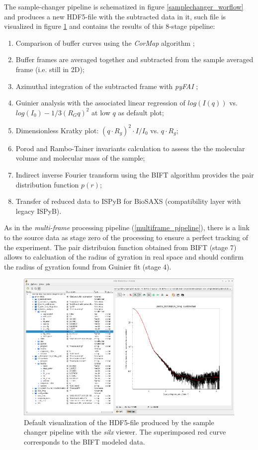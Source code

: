 \documentclass[preprint]{iucr}              %
\begin{document}
The sample-changer pipeline is schematized in figure \ref{samplechanger_worflow} and produces a new HDF5-file with the subtracted data in it, such file is visualized in figure \ref{subtracted} and contains the results of this 8-stage pipeline: 
\begin{enumerate}
    \item Comparison of buffer curves using the \textit{CorMap} algorithm \cite{CorMap};
    \item Buffer frames are averaged together and subtracted from the sample averaged frame (i.e. still in 2D);
    \item Azimuthal integration of the subtracted frame with \textit{pyFAI} \cite{pyfai_2020};
    \item Guinier analysis with the associated linear regression of $log(I(q))$ vs. $log(I_0)-1/3 (R_{G}q)^{2}$ at low $q$ as default plot;
    \item Dimensionless Kratky plot: $(q\cdot R_g)^2\cdot I/I_0$  vs. $q\cdot R_g$;
    \item Porod \cite{glatter+kratky} and Rambo-Tainer invariants \cite{RamboTainerNature2013} calculation to assess the the molecular volume and molecular mass of the sample;
    \item Indirect inverse Fourier transform using the BIFT algorithm \cite{bift} provides the pair distribution function $p(r)$;
    \item Transfer of reduced data to ISPyB for BioSAXS (compatibility layer with legacy ISPyB).
\end{enumerate}
As in the \textit{multi-frame} processing pipeline (\ref{multiframe_pipeline}), there is a link to the source data as stage zero of the processing to ensure a perfect tracking of the experiment.
The pair distribuion function obtained from BIFT (stage 7) allows to calcluation of the radius of gyration in real space and should confirm the radius of gyration found from Guinier fit (stage 4). 

\begin{figure}
\label{subtracted}
\includegraphics*[width=12cm]{subtracted.eps}
\caption{Default visualization of the HDF5-file produced by the sample changer pipeline with the \textit{silx} viewer. 
The superimposed red curve corresponds to the BIFT modeled data.}
\end{figure}
\end{document}

